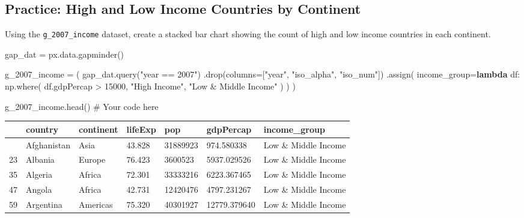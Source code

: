 \documentclass[
  letterpaper,
  DIV=11,
  numbers=noendperiod]{scrreprt}
\newenvironment{Shaded}{\begin{snugshade}}{\end{snugshade}}
\newcommand{\CommentTok}[1]{\textcolor[rgb]{0.37,0.37,0.37}{#1}}
\newcommand{\DecValTok}[1]{\textcolor[rgb]{0.68,0.00,0.00}{#1}}
\newcommand{\KeywordTok}[1]{\textcolor[rgb]{0.00,0.23,0.31}{\textbf{#1}}}
\newcommand{\NormalTok}[1]{\textcolor[rgb]{0.00,0.23,0.31}{#1}}
\newcommand{\OperatorTok}[1]{\textcolor[rgb]{0.37,0.37,0.37}{#1}}
\newcommand{\StringTok}[1]{\textcolor[rgb]{0.13,0.47,0.30}{#1}}
\begin{document}
\begin{tcolorbox}[enhanced jigsaw, colframe=quarto-callout-tip-color-frame, opacityback=0, titlerule=0mm, bottomrule=.15mm, breakable, leftrule=.75mm, colbacktitle=quarto-callout-tip-color!10!white, title=\textcolor{quarto-callout-tip-color}{\faLightbulb}\hspace{0.5em}{Practice}, rightrule=.15mm, coltitle=black, opacitybacktitle=0.6, colback=white, left=2mm, arc=.35mm, toptitle=1mm, bottomtitle=1mm, toprule=.15mm]

\subsection{Practice: High and Low Income Countries by
Continent}\label{practice-high-and-low-income-countries-by-continent}

Using the \texttt{g\_2007\_income} dataset, create a stacked bar chart
showing the count of high and low income countries in each continent.

\begin{Shaded}
\begin{Highlighting}[]
\NormalTok{gap\_dat }\OperatorTok{=}\NormalTok{ px.data.gapminder()}

\NormalTok{g\_2007\_income }\OperatorTok{=}\NormalTok{ (}
\NormalTok{    gap\_dat.query(}\StringTok{"year == 2007"}\NormalTok{)}
\NormalTok{    .drop(columns}\OperatorTok{=}\NormalTok{[}\StringTok{"year"}\NormalTok{, }\StringTok{"iso\_alpha"}\NormalTok{, }\StringTok{"iso\_num"}\NormalTok{])}
\NormalTok{    .assign(}
\NormalTok{        income\_group}\OperatorTok{=}\KeywordTok{lambda}\NormalTok{ df: np.where(}
\NormalTok{            df.gdpPercap }\OperatorTok{\textgreater{}} \DecValTok{15000}\NormalTok{, }\StringTok{"High Income"}\NormalTok{, }\StringTok{"Low \& Middle Income"}
\NormalTok{        )}
\NormalTok{    )}
\NormalTok{)}

\NormalTok{g\_2007\_income.head()}
\CommentTok{\# Your code here}
\end{Highlighting}
\end{Shaded}

\begin{longtable}[]{@{}lllllll@{}}
\toprule\noalign{}
& country & continent & lifeExp & pop & gdpPercap & income\_group \\
\midrule\noalign{}
\endhead
\bottomrule\noalign{}
\endlastfoot
11 & Afghanistan & Asia & 43.828 & 31889923 & 974.580338 & Low \& Middle
Income \\
23 & Albania & Europe & 76.423 & 3600523 & 5937.029526 & Low \& Middle
Income \\
35 & Algeria & Africa & 72.301 & 33333216 & 6223.367465 & Low \& Middle
Income \\
47 & Angola & Africa & 42.731 & 12420476 & 4797.231267 & Low \& Middle
Income \\
59 & Argentina & Americas & 75.320 & 40301927 & 12779.379640 & Low \&
Middle Income \\
\end{longtable}

\end{tcolorbox}
\end{document}
